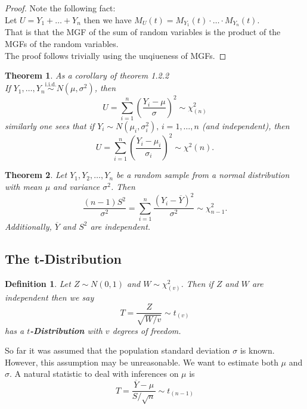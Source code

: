 \documentclass[a4paper,12pt]{article}
\theoremstyle{nonitalic}
\newtheorem{definition}{Definition}[subsection]
\newtheorem{theorem}{Theorem}[subsection]
\begin{document}
    \begin{proof}
        Note the following fact:\\
        Let $U = Y_1 + \ldots + Y_n$ then we have $M_U(t) = M_{Y_1}(t) \cdot \ldots \cdot M_{Y_n}(t)$.\\
        That is that the MGF of the sum of random variables is the product of the MGFs of the random variables.\\
        The proof follows trivially using the unqiueness of MGFs.
    \end{proof}

    \begin{theorem}
        As a corollary of theorem 1.2.2\\
        If \( Y_1, \ldots, Y_n \overset{\text{i.i.d.}}{\sim} N(\mu, \sigma^2) \), then
        \[
            U = \sum_{i=1}^{n} \left( \frac{Y_i - \mu}{\sigma} \right)^2 \sim \chi^2_{(n)}
        \]
        similarly one sees that if \( Y_i \sim N(\mu_i, \sigma_i^2), \, i = 1, \ldots, n \) (and independent), then
        \[
        U = \sum_{i=1}^{n} \left( \frac{Y_i - \mu_i}{\sigma_i} \right)^2 \sim \chi^2(n).
        \]
    \end{theorem}

    \begin{theorem}
        Let \( Y_1, Y_2, \ldots, Y_n \) be a random sample from a normal distribution with mean \(\mu\) and variance \(\sigma^2\). Then
        \[
        \frac{(n-1)S^2}{\sigma^2} = \sum_{i=1}^{n} \frac{(Y_i - \overline{Y})^2}{\sigma^2} \sim \chi^2_{n-1}.
        \]
        Additionally, \(\overline{Y}\) and \(S^2\) are independent.
    \end{theorem}

    \newpage

    \subsection{The t-Distribution}

    \begin{definition}
        Let $Z \sim N(0,1)$ and $W \sim \chi^2_{(v)}$. Then if $Z$ and $W$ are independent then we say
        \[
            T = \frac{Z}{\sqrt{W/v}} \sim t_{(v)}
        \]
        has a \textbf{$t$-Distribution} with $v$ degrees of freedom.
    \end{definition}

    So far it was assumed that the population standard deviation $\sigma$ is known. However, this assumption may be unreasonable. We want to estimate both $\mu$ and $\sigma$. A natural statistic to deal with inferences on $\mu$ is
    \[
        T = \frac{\overline{Y} - \mu}{S/\sqrt{n}} \sim t_{(n-1)}
    \]
    
\end{document}

